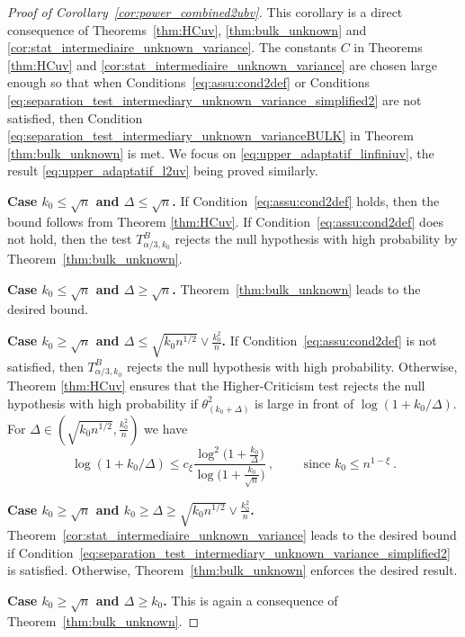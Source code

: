 \documentclass[twoside,11pt]{article}
\newcommand{\<}{\langle}
\renewcommand{\>}{\rangle}
\begin{document}
\begin{proof}[Proof of Corollary~\ref{cor:power_combined2ubv}]
This corollary is a direct consequence of Theorems~\ref{thm:HCuv}, \ref{thm:bulk_unknown} and \ref{cor:stat_intermediaire_unknown_variance}. The constants $C$ in Theorems \ref{thm:HCuv} and \ref{cor:stat_intermediaire_unknown_variance} are chosen large enough so that when  Conditions~\eqref{eq:assu:cond2def} or Conditions \eqref{eq:separation_test_intermediary_unknown_variance_simplified2} are not satisfied, then  Condition \eqref{eq:separation_test_intermediary_unknown_varianceBULK} in Theorem \ref{thm:bulk_unknown} is met.
We focus on  \eqref{eq:upper_adaptatif_linfiniuv}, the result \eqref{eq:upper_adaptatif_l2uv} being proved similarly.



\noindent
{\bf Case $k_0\leq \sqrt{n}$ and $\Delta\leq \sqrt{n}$.} If Condition~\eqref{eq:assu:cond2def} holds, then the bound follows from Theorem \ref{thm:HCuv}. If Condition~\eqref{eq:assu:cond2def} does not hold, then the test $T_{\alpha/3,k_0}^{B}$ rejects the null hypothesis with high probability by Theorem~\ref{thm:bulk_unknown}.


\noindent
{\bf Case $k_0\leq \sqrt{n}$ and $\Delta\geq \sqrt{n}$.} Theorem~\ref{thm:bulk_unknown} leads to the desired bound.

\noindent
{\bf Case $k_0\geq \sqrt{n}$ and $\Delta\leq \sqrt{k_0n^{1/2}}\vee \frac{k_0^2}{n}$.}  If Condition~\eqref{eq:assu:cond2def} is not satisfied, then $T_{\alpha/3,k_0}^{B}$ rejects the null hypothesis with high probability. Otherwise, Theorem \ref{thm:HCuv} ensures that the Higher-Criticism test rejects the null hypothesis with high probability if $\theta^2_{(k_0+\Delta)}$ is large in front of $\log(1+k_0/\Delta)$. For $\Delta \in (\sqrt{k_0n^{1/2}},\frac{k_0^2}{n})$ we have 
\[\log(1+k_0/\Delta)\leq c_{\xi}\frac{\log^2\big(1+\frac{k_0}{\Delta}\big)}{\log\big(1+\frac{k_0}{\sqrt{n}}\big)}\ , \quad \quad\text{ since }k_0\leq n^{1-\xi}\ . 
\]




\noindent
{\bf Case $k_0\geq \sqrt{n}$ and $k_0 \geq \Delta\geq \sqrt{k_0n^{1/2}}\vee \frac{k_0^2}{n}$.} Theorem~\ref{cor:stat_intermediaire_unknown_variance} leads to the desired bound if  Condition~\eqref{eq:separation_test_intermediary_unknown_variance_simplified2} is satisfied. Otherwise, Theorem~\ref{thm:bulk_unknown} enforces the desired result. 



\noindent
{\bf Case $k_0\geq \sqrt{n}$ and $ \Delta\geq k_0$.} This is again a consequence of Theorem~\ref{thm:bulk_unknown}.


\end{proof}
\end{document}
